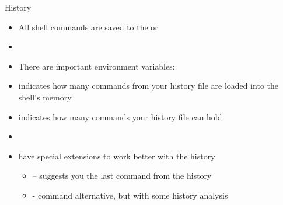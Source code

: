 \documentclass[usenames,dvipsnames,10pt,aspectratio=169]{beamer}
\begin{document}
\begin{frame}{History}
    \begin{itemize}
        \item All shell commands are saved to the  or 
        \item {}
        \item There are important environment variables:
        \item {} indicates how many commands from your history file are loaded into the shell's memory
        \item {} indicates how many commands your history file can hold
        \item {}
        \item {} have special extensions to work better with the history
        \begin{itemize}
            \item {} -- suggests you the last command from the history 
            \item {} -  command alternative, but with some history analysis
        \end{itemize}
    \end{itemize}
\end{frame}
\end{document}
